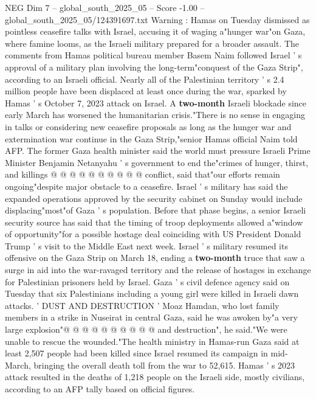 \begin{textsample}{NEG Dim 7 – global\_south\_2025\_05 – Score -1.00 – global\_south\_2025\_05/124391697.txt}  \label{ex:f7_neg_020}
Warning : Hamas on Tuesday dismissed as pointless ceasefire talks with Israel, accusing it of waging a"hunger war"on Gaza, where famine looms, as the Israeli military prepared for a broader assault.
The comments from Hamas political bureau member Basem Naim followed Israel ' s approval of a military plan involving the long-term"conquest of the Gaza Strip", according to an Israeli official.
Nearly all of the Palestinian territory ' s 2.4 million people have been displaced at least once during the war, sparked by Hamas ' s October 7, 2023 attack on Israel.
A \textbf{two-month} Israeli blockade since early March has worsened the humanitarian crisis."There is no sense in engaging in talks or considering new ceasefire proposals as long as the hunger war and extermination war continue in the Gaza Strip,"senior Hamas official Naim told AFP.
The former Gaza health minister said the world must pressure Israeli Prime Minister Benjamin Netanyahu ' s government to end the"crimes of hunger, thirst, and killings @ @ @ @ @ @ @ @ @ @ conflict, said that"our efforts remain ongoing"despite major obstacle to a ceasefire.
Israel ' s military has said the expanded operations approved by the security cabinet on Sunday would include displacing"most"of Gaza ' s population.
Before that phase begins, a senior Israeli security source has said that the timing of troop deployments allowed a"window of opportunity"for a possible hostage deal coinciding with US President Donald Trump ' s visit to the Middle East next week.
Israel ' s military resumed its offensive on the Gaza Strip on March 18, ending a \textbf{two-month} truce that saw a surge in aid into the war-ravaged territory and the release of hostages in exchange for Palestinian prisoners held by Israel.
Gaza ' s civil defence agency said on Tuesday that six Palestinians including a young girl were killed in Israeli dawn attacks. ' DUST AND DESTRUCTION ' Moaz Hamdan, who lost family members in a strike in Nuseirat in central Gaza, said he was awoken by"a very large explosion"@ @ @ @ @ @ @ @ @ @ and destruction", he said."We were unable to rescue the wounded."The health ministry in Hamas-run Gaza said at least 2,507 people had been killed since Israel resumed its campaign in mid-March, bringing the overall death toll from the war to 52,615.
Hamas ' s 2023 attack resulted in the deaths of 1,218 people on the Israeli side, mostly civilians, according to an AFP tally based on official figures.

\end{textsample}

